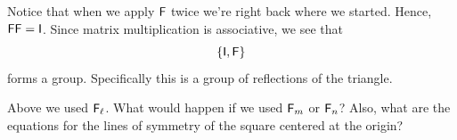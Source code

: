 \documentclass{ximera}
\begin{document}
Notice that when we apply $\mathsf{F}$ twice we're right back where we
started. Hence, $\mathsf{F} \mathsf{F} = \mathsf{I}$. Since matrix
multiplication is associative, we see that
\[
\{ \mathsf{I}, \mathsf{F} \}
\]
forms a group. Specifically this is a group of reflections of the
triangle.

\begin{question} 
Above we used $\mathsf{F}_\ell$. What would happen if we used $\mathsf{F}_m$
or $\mathsf{F}_n$? Also, what are the equations for the lines of symmetry
of the square centered at the origin?
\end{question}
\end{document}
